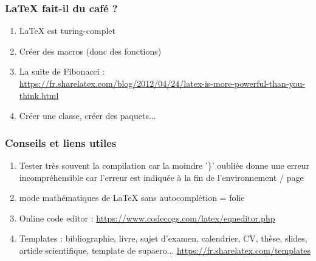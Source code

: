 \documentclass{beamer}
\begin{document}
\begin{frame}
    \frametitle{LaTeX fait-il du café ?}
    \begin{enumerate}
        \item<1-> LaTeX est turing-complet
        \item<2-> Créer des macros (donc des fonctions)        
        \item<3-> La suite de Fibonacci :\\
        \url{https://fr.sharelatex.com/blog/2012/04/24/latex-is-more-powerful-than-you-think.html}
        \item<4-> Créer une classe, créer des paquets...
    \end{enumerate}
\end{frame}

\begin{frame}[fragile]
    \frametitle{Conseils et liens utiles}
    \begin{enumerate}
        \item<1-> Tester très souvent la compilation car la moindre '\}' oubliée donne une erreur incompréhensible car l'erreur est indiquée à la fin de l'environnement / page 
        \item<2-> mode mathématiques de LaTeX sans autocomplétion = folie
        \item<3-> Online code editor : \url{https://www.codecogs.com/latex/eqneditor.php}
        \item<4-> Templates : bibliographie, livre, sujet d'examen, calendrier, CV, thèse, slides, article scientifique, template de supaero...
        \url{https://fr.sharelatex.com/templates}
    \end{enumerate}
\end{frame}
\end{document}

